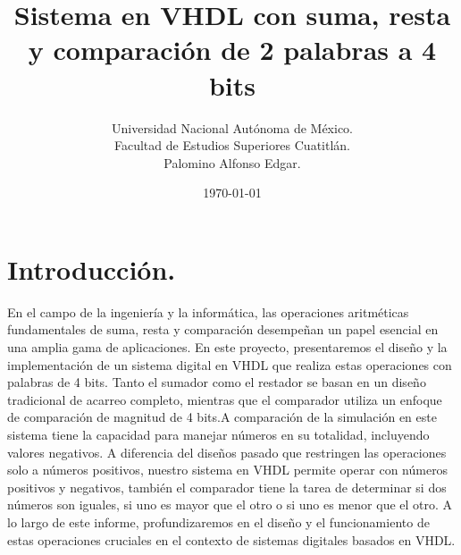 \documentclass[a4paper, 12pt]{article}
\title{Sistema en VHDL con suma, resta y comparación de 2 palabras a 4 bits}
\author{Universidad Nacional Autónoma de México.\\Facultad de Estudios Superiores Cuatitlán.\\Palomino Alfonso Edgar.}
\date{\today}
\begin{document}
    \maketitle  
    \vspace{2ex}

    \section{Introducción.}
    En el campo de la ingeniería y la informática, las operaciones aritméticas fundamentales de suma, resta y comparación desempeñan un papel esencial en una amplia gama de aplicaciones. En este proyecto, presentaremos el diseño y la implementación de un sistema digital en VHDL que realiza estas operaciones con palabras de 4 bits. Tanto el sumador como el restador se basan en un diseño tradicional de acarreo completo, mientras que el comparador utiliza un enfoque de comparación de magnitud de 4 bits.A comparación de la simulación en este sistema tiene la capacidad para manejar números en su totalidad, incluyendo valores negativos. A diferencia del diseños pasado que restringen las operaciones solo a números positivos, nuestro sistema en VHDL permite operar con números positivos y negativos, también el comparador tiene la tarea de determinar si dos números son iguales, si uno es mayor que el otro o si uno es menor que el otro. A lo largo de este informe, profundizaremos en el diseño y el funcionamiento de estas operaciones cruciales en el contexto de sistemas digitales basados en VHDL.
    
\end{document}
